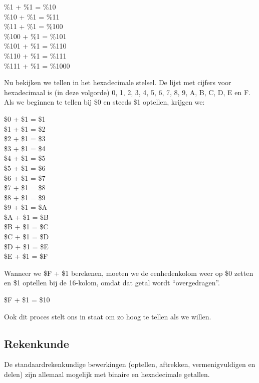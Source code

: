 \begin{center}
  \%1 + \%1 = \%10 \\  \%10 + \%1 = \%11 \\  \%11 + \%1 = \%100 \\  \%100 + \%1 = \%101 \\  \%101 + \%1 = \%110 \\  \%110 + \%1 = \%111 \\  \%111 + \%1 = \%1000 \\
\end{center}

Nu bekijken we tellen in het hexadecimale stelsel. De lijst met cijfers voor hexadecimaal is (in deze volgorde) 0, 1, 2, 3, 4, 5, 6, 7, 8, 9, A, B, C, D, E en F. Als we beginnen te tellen bij \$0 en steeds \$1 optellen, krijgen we:

\begin{center}
	\$0 + \$1 = \$1 \\	\$1 + \$1 = \$2 \\	\$2 + \$1 = \$3 \\	\$3 + \$1 = \$4 \\	\$4 + \$1 = \$5 \\	\$5 + \$1 = \$6 \\	\$6 + \$1 = \$7 \\	\$7 + \$1 = \$8 \\	\$8 + \$1 = \$9 \\	\$9 + \$1 = \$A \\	\$A + \$1 = \$B \\	\$B + \$1 = \$C \\	\$C + \$1 = \$D \\	\$D + \$1 = \$E \\	\$E + \$1 = \$F \\
\end{center}

Wanneer we \$F + \$1 berekenen, moeten we de eenhedenkolom weer op \$0 zetten en \$1 optellen bij de 16-kolom, omdat dat getal wordt ``overgedragen''.

\begin{center}
	\$F + \$1 = \$10
\end{center}

Ook dit proces stelt ons in staat om zo hoog te tellen als we willen.

\subsection{Rekenkunde}De standaardrekenkundige bewerkingen (optellen, aftrekken, vermenigvuldigen en delen) zijn allemaal mogelijk met binaire en hexadecimale getallen.

